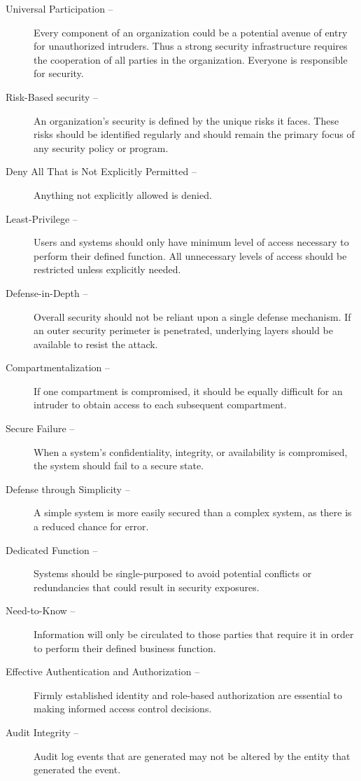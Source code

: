 \documentclass[sec]{policy}
\begin{document}
		\begin{description}
			\item[Universal Participation –] Every component of an organization could be a potential avenue of entry for unauthorized intruders.  Thus a strong security infrastructure requires the cooperation of all parties in the organization.  Everyone is responsible for security.
			\item [Risk-Based security –] An organization’s security is defined by the unique risks it faces.  These risks should be identified regularly and should remain the primary focus of any security policy or program.
			\item [Deny All That is Not Explicitly Permitted –] Anything not explicitly allowed is denied.
			\item [Least-Privilege –] Users and systems should only have minimum level of access necessary to perform their defined function.  All unnecessary levels of access should be restricted unless explicitly needed.
			\item [Defense-in-Depth –] Overall security should not be reliant upon a single defense mechanism.  If an outer security perimeter is penetrated, underlying layers should be available to resist the attack.
			\item [Compartmentalization –] If one compartment is compromised, it should be equally difficult for an intruder to obtain access to each subsequent compartment.
			\item [Secure Failure –] When a system’s confidentiality, integrity, or availability is compromised, the system should fail to a secure state.
			\item [Defense through Simplicity –] A simple system is more easily secured than a complex system, as there is a reduced chance for error.
			\item [Dedicated Function –] Systems should be single-purposed to avoid potential conflicts or redundancies that could result in security exposures.
			\item [Need-to-Know –] Information will only be circulated to those parties that require it in order to perform their defined business function.
			\item [Effective Authentication and Authorization –] Firmly established identity and role-based authorization are essential to making informed access control decisions.
			\item [Audit Integrity –] Audit log events that are generated may not be altered by the entity that generated the event.
		\end{description}
		
\end{document}
